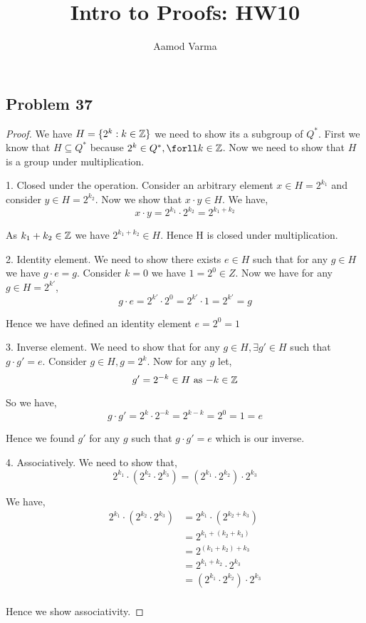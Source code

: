 \documentclass[a4paper]{report}
\title{Intro to Proofs: HW10}
\author{Aamod Varma}
\begin{document}
\maketitle
\date{}
\subsection*{Problem 37}
\begin{proof}
    We have $H = \{2^{k}: k \in \mathbb{Z}\}$ we need to show its a subgroup of $Q^{*}$. First we know that $H \subseteq Q^{*}$  because $2^{k} \in Q^{*}, \forll k \in \Z$. Now we need to show that $H$ is a group under multiplication.

    1. Closed under the operation. Consider an arbitrary element $x \in H = 2^{k_1}$ and consider $y \in H = 2^{k_2}$. Now we show that $x \cdot y  \in H$. We have, 
    $$ x \cdot y = 2^{k_1} \cdot 2^{k_2} = 2^{k_1 + k_2} $$ 

    As $k_1+k_2 \in \mathbb{Z}$ we have $2^{k_1 + k_2} \in H$. Hence H is closed under multiplication.

    2. Identity element. We need to show there exists $e \in H$ such that for any $g \in H$ we have $g \cdot e = g$. Consider  $k = 0$ we have $1 = 2^{0} \in Z$. Now we have for any $g \in H = 2^{k'}$, 
    $$ g \cdot e = 2^{k'} \cdot 2^{0} = 2^{k'} \cdot 1 = 2^{k'} = g $$ 

    Hence we have defined an identity element $e = 2^{0} = 1$

    3. Inverse element. We need to show that for any $g \in H, \exists g' \in H$ such that $g \cdot g' = e$. Consider  $g \in H, g = 2^{k}$. Now for any $g$ let, 
    $$ g' = 2^{-k} \in H \text{ as $-k \in \mathbb{Z}$} $$ 

    So we have, 
    $$ g \cdot g' = 2^{k} \cdot 2^{-k} = 2^{k - k} = 2^{0} = 1 = e $$ 

    Hence we found $g'$ for any $g$ such that $g \cdot g' = e$ which is our inverse.

    4. Associatively. We need to show that, 
    $$ 2^{k_1}\cdot (2^{k_2} \cdot 2^{k_3}) = (2^{k_1}\cdot 2^{k_2}) \cdot 2^{k_3} $$ 

    We have, 
    \begin{align*}
        2^{k_1}\cdot (2^{k_2} \cdot 2^{k_3})&= 2^{k_1} \cdot (2^{k_2 + k_3})\\
                                            &= 2^{k_1 + (k_2 + k_3)}\\
                                            &= 2^{(k_1 + k_2) + k_3}\\
                                            &= 2^{k_1 + k_2} \cdot 2^{k_3}\\
                                            &= (2^{k_1} \cdot 2^{k_2}) \cdot 2^{k_3}\\
    \end{align*}

    Hence we show associativity. 

\end{proof}
\end{document}
